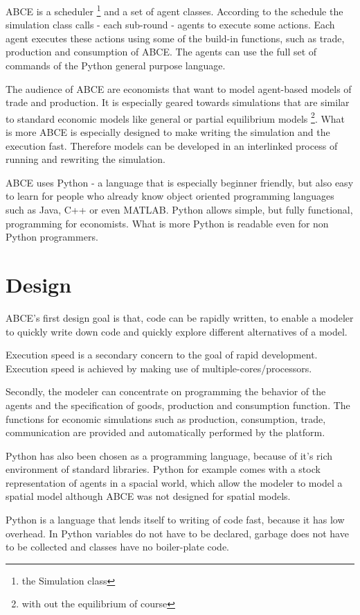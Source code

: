 \documentclass[letterpaper,10pt,english]{sphinxmanual}
\begin{document}
ABCE is a scheduler \footnote{
the Simulation class
} and a set of agent classes.
According to the schedule the simulation class calls - each sub-round - agents
to execute some actions. Each agent executes these actions
using some of the build-in functions, such as trade, production and
consumption of ABCE. The agents can use the full set of commands of the
Python general purpose language.

The audience of ABCE are economists that want to model agent-based
models of trade and production. It is especially geared towards
simulations that are similar to standard economic models
like general or partial equilibrium models \footnote{
with out the equilibrium of course
}. What is more ABCE is
especially designed to make writing the simulation and the execution
fast. Therefore models can be developed in an interlinked process of
running and rewriting the simulation.

ABCE uses Python - a language that is especially beginner friendly, but also
easy to learn for people who already know object oriented programming
languages such as Java, C++ or even MATLAB.
Python allows simple, but fully functional, programming for economists.
What is more Python is readable even for non Python programmers.


\chapter{Design}
\label{introduction:design}
ABCE's first design goal is that, code can be rapidly written,
to enable a modeler to quickly write down
code and quickly explore different alternatives of a model.

Execution speed is a secondary concern to the goal of rapid development.
Execution speed is achieved by making use of multiple-cores/processors.

Secondly, the modeler can concentrate on programming the behavior of the agents and
the specification of goods, production and consumption function.
The functions for economic simulations such as production, consumption,
trade, communication are provided and automatically performed by the platform.

Python has also been chosen as a programming language, because of
it's rich environment of standard libraries. Python for example
comes with a stock representation of agents in a spacial world,
which allow the modeler to model a spatial model although ABCE
was not designed for spatial models.

Python is a language that lends itself to writing of code fast, because it
has low overhead. In Python variables do not have to be declared, garbage
does not have to be collected and classes have no boiler-plate code.
\end{document}
